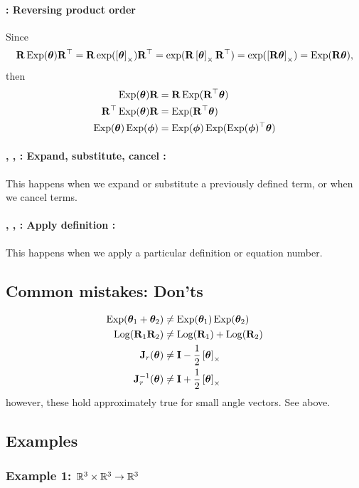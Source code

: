\paragraph{\cswap : Reversing product order}

Since $$\bfR\Exp(\bth)\bfR\tr=\bfR\exp(\hatx{\bth})\bfR\tr=\exp(\bfR\hatx{\bth}\bfR\tr)=\exp(\hatx{\bfR\bth})=\Exp(\bfR\bth),$$ then
%
\begin{align}
\Exp(\bth)\bfR &= \bfR\Exp(\bfR\tr\bth) \\
\bfR\tr\Exp(\bth)\bfR &= \Exp(\bfR\tr\bth) \\
\Exp(\bth)\Exp(\bphi) &= \Exp(\bphi)\Exp(\Exp(\bphi)\tr\bth) 
\end{align}


\paragraph{\cexpand, \csubst, \ccancel : Expand, substitute, cancel :} This happens when we expand or substitute a previously defined term, or when we cancel terms.

\paragraph{\tcom{$\oplus$}, \tcom{$\ominus$},  : Apply definition :} This happens when we apply a particular definition or equation number.

\subsection{Common mistakes: Don'ts}

\begin{align}
\Exp(\bth_1+\bth_2) &\ne \Exp(\bth_1)\Exp(\bth_2) \\
\Log(\bfR_1\bfR_2) &\ne \Log(\bfR_1) + \Log(\bfR_2) \\
\bfJ_r(\bth) &\ne \bfI - \frac12\hatx{\bth} \\
\bfJ_r\inv(\bth) &\ne \bfI + \frac12\hatx{\bth} 
\end{align}
%
however, these hold approximately true for small angle vectors. See \csmall above.


\subsection{Examples}

\subsubsection{Example 1: $\bbR^3\times\bbR^3\to\bbR^3$} 

